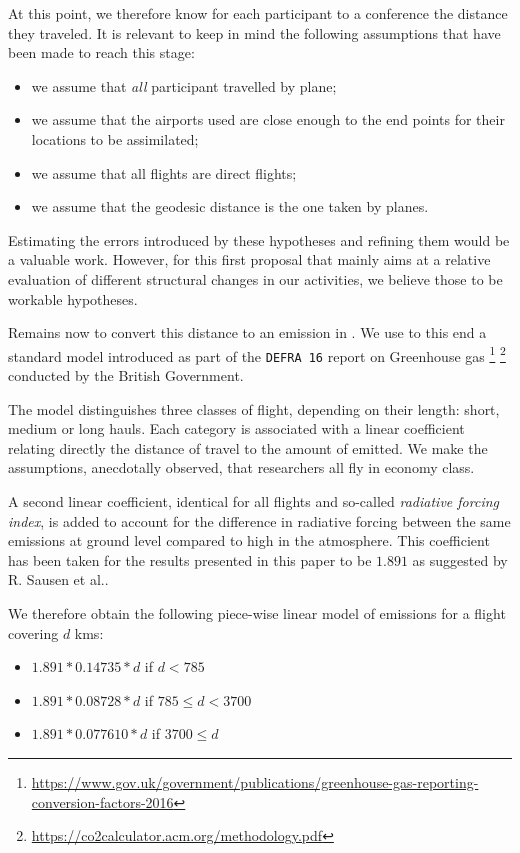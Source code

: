 At this point, we therefore know for each participant to a conference the
distance they traveled.
It is relevant to keep in mind the following assumptions that have
been made to reach this stage:
\begin{itemize}
\item we assume that \emph{all} participant travelled by plane;
\item we assume that the airports used are close enough to the end points for their locations to be assimilated;
\item we assume that all flights are direct flights;
\item we assume that the geodesic distance is the one taken by planes.
\end{itemize}

Estimating the errors introduced by these hypotheses and refining them would be
a valuable work. However, for this first proposal that mainly aims at a relative
evaluation of different structural changes in our activities, we believe those
to be workable hypotheses.

Remains now to convert this distance to an emission in \gaz. We use to this end
a standard model introduced as part of the \texttt{DEFRA 16} report on
Greenhouse gas
\footnote{\url{https://www.gov.uk/government/publications/greenhouse-gas-reporting-conversion-factors-2016}}
\footnote{\url{https://co2calculator.acm.org/methodology.pdf}}
conducted by the British Government.

The model distinguishes three classes of flight, depending on their length:
short, medium or long hauls. Each category is associated with a linear
coefficient relating directly the distance of travel to the amount of \gaz
emitted. We make the assumptions, anecdotally observed, that researchers all
fly in economy class.

A second linear coefficient, identical for all flights and so-called
\emph{radiative forcing index}, is added to account for the difference in
radiative forcing between the same emissions at ground level compared to high in
the atmosphere. This coefficient has been taken for the results presented in this
paper to be $1.891$ as suggested by R. Sausen et al.\cite{Sausen05}.

We therefore obtain the following piece-wise linear model of emissions for a flight covering $d$ kms:
\begin{itemize}
\item $1.891 * 0.14735 * d$ \gazunit if $d < 785$
\item $1.891 * 0.08728 * d$ \gazunit if $785 \leq d < 3700$
\item $1.891 * 0.077610 * d$ \gazunit if $3700\leq d  $
\end{itemize}


